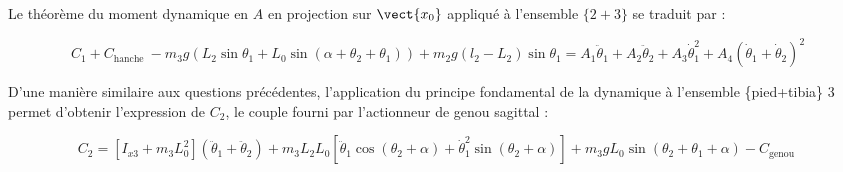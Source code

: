 %
%
%

\ifprof
\else
Le théorème du moment dynamique en $A$ en projection sur $\vect{x_0}$ appliqué à l'ensemble $\{2+3\}$ se traduit par :

$$C_{1} + C_{\textrm {hanche }}- m_3 g\left(  L_2 \sin \theta_1 +  L_0 \sin\left( \alpha + \theta_2 + \theta_1\right)\right)  + m_2 g\left( l_2 - L_2\right) \sin \theta_1 = A_{1} \ddot{\theta}_{1}+A_{2} \ddot{\theta}_{2}+A_{3} \dot{\theta}_{1}^{2}+A_{4}\left(\dot{\theta}_{1}+\dot{\theta}_{2}\right)^{2}$$

D'une manière similaire aux questions précédentes, l'application du principe fondamental de la dynamique à l'ensemble \{pied+tibia\} 3 permet d'obtenir l'expression de $C_{2}$, le couple fourni par l'actionneur de genou sagittal :

$$
C_{2}=\left[I_{x 3}+m_{3} L_{0}^{2}\right]\left(\ddot{\theta}_{1}+\ddot{\theta}_{2}\right)+m_{3} L_{2} L_{0}\left[\ddot{\theta}_{1} \cos \left(\theta_{2}+\alpha\right)+\dot{\theta}_{1}^{2} \sin \left(\theta_{2}+\alpha\right)\right]+m_{3} g L_{0} \sin \left(\theta_{2}+\theta_{1}+\alpha\right)-C_{\text {genou }}
$$
\fi

